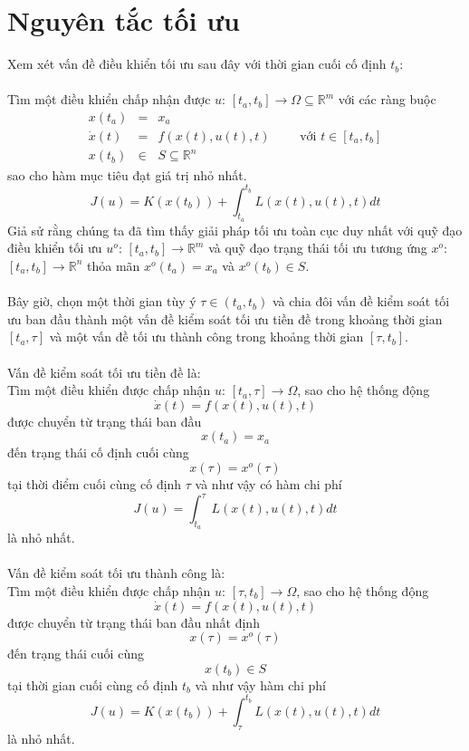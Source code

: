 \documentclass[12pt,a4paper]{report}
\begin{document}
	\section{Nguyên tắc tối ưu}
	Xem xét vấn đề điều khiển tối ưu sau đây với thời gian cuối cố định $t_b$:\\\\Tìm một điều khiển chấp nhận được $u$: $[t_a, t_b] \to \Omega \subseteq \mathbb{R}^m$ với các ràng buộc \begin{eqnarray}
		x(t_a) &=& x_a \nonumber \\ \dot{x}(t) &=& f(x(t), u(t), t) \qquad \text{ với } t \in [t_a, t_b] \nonumber \\ x(t_b)&\in& S \subseteq \mathbb{R}^n \nonumber
	\end{eqnarray} sao cho hàm mục tiêu đạt giá trị nhỏ nhất. $$J(u) = K(x(t_b)) + \int_{t_a}^{t_b}L(x(t),u(t), t)dt$$
	Giả sử rằng chúng ta đã tìm thấy giải pháp tối ưu toàn cục duy nhất với quỹ đạo điều khiển tối ưu $u^o$: $[t_a, t_b] \to \mathbb{R}^m$ và quỹ đạo trạng thái tối ưu tương ứng $x^o$: $[t_a, t_b] \to \mathbb{R}^n$ thỏa mãn $x^o (t_a) = x_a$ và $x^o(t_b) \in S$.
	\\\\Bây giờ, chọn một thời gian tùy ý $\tau \in(t_a, t_b)$ và chia đôi vấn đề kiểm soát tối ưu ban đầu thành một vấn đề kiểm soát tối ưu tiền đề trong khoảng thời gian $[t_a,\tau]$ và một vấn đề tối ưu thành công trong khoảng thời gian $[\tau, t_b]$.\\\\Vấn đề kiểm soát tối ưu tiền đề là:\\Tìm một điều khiển được chấp nhận $u$: $[t_a, \tau] \to \Omega$, sao cho hệ thống động $$\dot{x}(t) = f(x(t),u(t),t)$$ được chuyển từ trạng thái ban đầu $$x(t_a) = x_a$$ đến trạng thái cố định cuối cùng $$x(\tau) = x^o(\tau)$$ tại thời điểm cuối cùng cố định $\tau$ và như vậy có hàm chi phí $$J(u) = \int_{t_a}^{\tau}L(x(t),u(t),t)dt$$ là nhỏ nhất.\\\\Vấn đề kiểm soát tối ưu thành công là:\\
	Tìm một điều khiển được chấp nhận $u$: $[\tau, t_b] \to \Omega$, sao cho hệ thống động $$\dot{x}(t) = f(x(t),u(t),t)$$ 
	được chuyển từ trạng thái ban đầu nhất định $$x(\tau) = x^o(\tau)$$ đến trạng thái cuối cùng $$x(t_b) \in S$$ tại thời gian cuối cùng cố định $t_b$ và như vậy hàm chi phí $$J(u) = K(x(t_b)) + \int_{\tau}^{t_b}L(x(t),u(t),t)dt$$ là nhỏ nhất.\\\\
\end{document}
